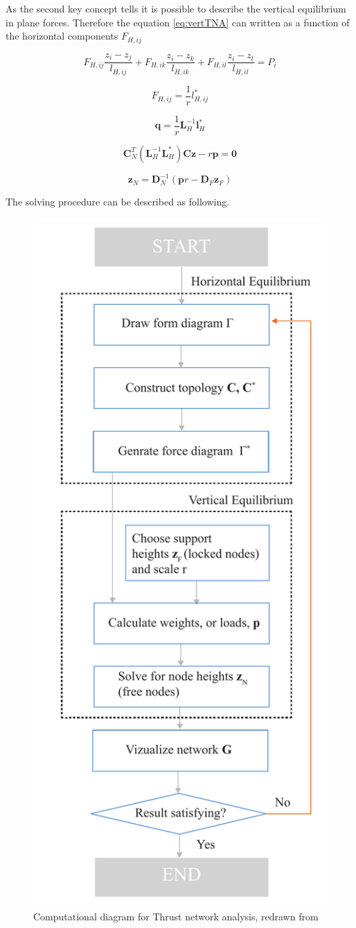 As the second key concept tells it is possible to describe the vertical equilibrium in plane forces. Therefore the equation \ref{eq:vertTNA} can written as a function of the horizontal components $F_{H,ij}$  




\begin{equation}
    F_{H,ij}\frac{z_i-z_j}{l_{H,ij}} +F_{H,ik}\frac{z_i-z_k}{l_{H,ik}}+F_{H,il}\frac{z_i-z_l}{l_{H,il}} = P_i
\end{equation}


\begin{equation}
    F_{H,ij} =\frac{1}{r}{l^*_{H,ij}}
\end{equation}

\begin{equation}
    \textbf{q}=\frac{1}{r}\textbf{L}^{-1}_H\textbf{l}^*_{H}
\end{equation}

\begin{equation}
    \textbf{C}^T_N(\textbf{L}^{-1}_H\textbf{L}^*_H)\textbf{C}\textbf{z}- r\textbf{p} = \textbf{0}
\end{equation}

\begin{equation}
    \textbf{z}_N = \textbf{D}^{-1}_N(\textbf{p}r-\textbf{D}_F\textbf{z}_F)
\end{equation}

The solving procedure can be described as following.\cite{ref:ShellOpt} 

\begin{figure}[H]
\centering
\includegraphics[width=0.5\linewidth ]{figure/Theory/TNAScheme.pdf}
\caption{Computational diagram for Thrust network analysis, redrawn from \cite{ref:ShellOpt} }
\end{figure}

